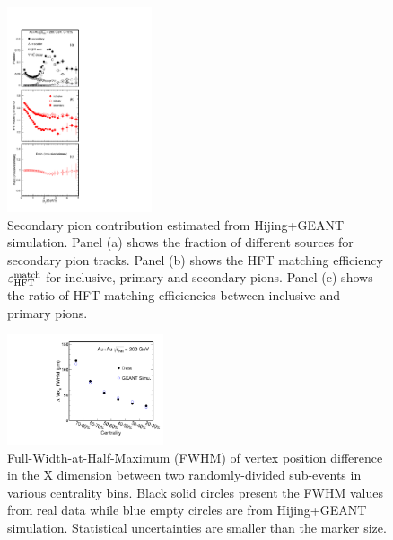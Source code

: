 \documentclass[%
 reprint,	
 amsmath,amssymb,
 aps,
 prc,
]{revtex4-1}
\begin{document}
\begin{figure}[h]
\centering
\includegraphics[width=0.38\textwidth, angle = 0]{fig/Fraction_Pion.pdf}
  \caption{Secondary pion contribution estimated from Hijing+GEANT simulation. Panel (a) shows the fraction of different sources for secondary pion tracks. Panel (b) shows the HFT matching efficiency $\varepsilon_{\rm HFT}^{\rm match}$ for inclusive, primary and secondary pions. Panel (c) shows the ratio of HFT matching efficiencies between inclusive and primary pions.}
\label{fig:Fraction_Pion} 
\end{figure}

\begin{figure}
\centering
\includegraphics[width=0.41\textwidth]{fig/vtxX_vsCent.pdf}
\caption{Full-Width-at-Half-Maximum (FWHM) of vertex position difference in the X dimension between two randomly-divided sub-events in various centrality bins. Black solid circles present the FWHM values from real data while blue empty circles are from Hijing+GEANT simulation. Statistical uncertainties are smaller than the marker size.}
\label{fig:vtxX_vsCent} 
\end{figure}
\end{document}
